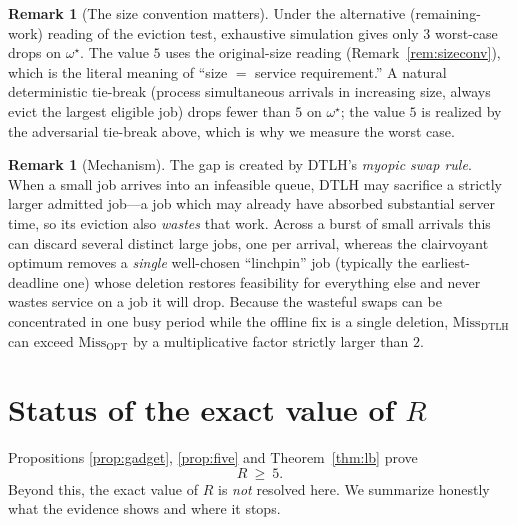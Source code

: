 \documentclass{amsart}
\theoremstyle{definition}
\newtheorem{remark}[theorem]{Remark}
\begin{document}
\begin{remark}[The size convention matters]
Under the alternative (remaining-work) reading of the eviction test, exhaustive
simulation gives only $3$ worst-case drops on $\omega^\star$. The value $5$ uses
the original-size reading (Remark~\ref{rem:sizeconv}), which is the literal
meaning of ``size $=$ service requirement.'' A natural deterministic tie-break
(process simultaneous arrivals in increasing size, always evict the largest
eligible job) drops fewer than $5$ on $\omega^\star$; the value $5$ is realized
by the adversarial tie-break above, which is why we measure the worst case.
\end{remark}

\begin{remark}[Mechanism]
The gap is created by DTLH's \emph{myopic swap rule}. When a small job arrives
into an infeasible queue, DTLH may sacrifice a strictly larger admitted job---a
job which may already have absorbed substantial server time, so its eviction also
\emph{wastes} that work. Across a burst of small arrivals this can discard
several distinct large jobs, one per arrival, whereas the clairvoyant optimum
removes a \emph{single} well-chosen ``linchpin'' job (typically the
earliest-deadline one) whose deletion restores feasibility for everything else
and never wastes service on a job it will drop. Because the wasteful swaps can be
concentrated in one busy period while the offline fix is a single deletion,
$\mathrm{Miss}_{\mathrm{DTLH}}$ can exceed $\mathrm{Miss}_{\mathrm{OPT}}$ by a
multiplicative factor strictly larger than $2$.
\end{remark}

\section{Status of the exact value of $R$}

Propositions \ref{prop:gadget}, \ref{prop:five} and Theorem~\ref{thm:lb} prove
\[
R\ \ge\ 5 .
\]
Beyond this, the exact value of $R$ is \emph{not} resolved here. We summarize
honestly what the evidence shows and where it stops.
\end{document}
